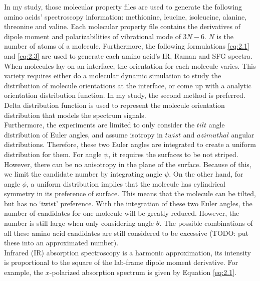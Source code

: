 In my study, those molecular property files are used to generate the following amino acids' spectroscopy information: methionine, leucine, isoleucine, alanine, threonine and valine. Each molecular property file contains the derivatives of dipole moment and polarizabilities of vibrational mode of $3N-6$. $N$ is the number of atoms of a molecule. Furthermore, the following formulations \ref{eq:2.1} and \ref{eq:2.3} are used to generate each amino acid's IR, Raman and SFG spectra. \\

When molecules lay on an interface, the orientation for each molecule varies. This variety requires either do a molecular dynamic simulation to study the distribution of molecule orientations at the interface, or come up with a analytic orientation distribution function. In my study, the second method is preferred. Delta distribution function is used to represent the molecule orientation distribution that models the spectrum signals. \\

Furthermore, the experiments are limited to only consider the $tilt$ angle distribution of Euler angles, and assume isotropy in $twist$ and $azimuthal$ angular distributions. Therefore, these two Euler angles are integrated to create a uniform distribution for them. For angle $\psi$, it requires the surfaces to be not striped. However, there can be no anisotropy in the plane of the surface. Because of this, we limit the candidate number by integrating angle $\psi$. On the other hand, for angle $\phi$, a uniform distribution implies that the molecule has cylindrical symmetry in its preference of surface. This means that the molecule can be tilted, but has no `twist' preference. With the integration of these two Euler angles, the number of candidates for one molecule will be greatly reduced. However, the number is still large when only considering angle $\theta$. The possible combinations of all these amino acid candidates are still considered to be excessive (TODO: put these into an approximated number). \\

Infrared (IR) absorption spectroscopy is a harmonic approximation, its intensity is proportional to the square of the lab-frame dipole moment derivative. For example, the $x$-polarized absorption spectrum is given by Equation \ref{eq:2.1}. \\

